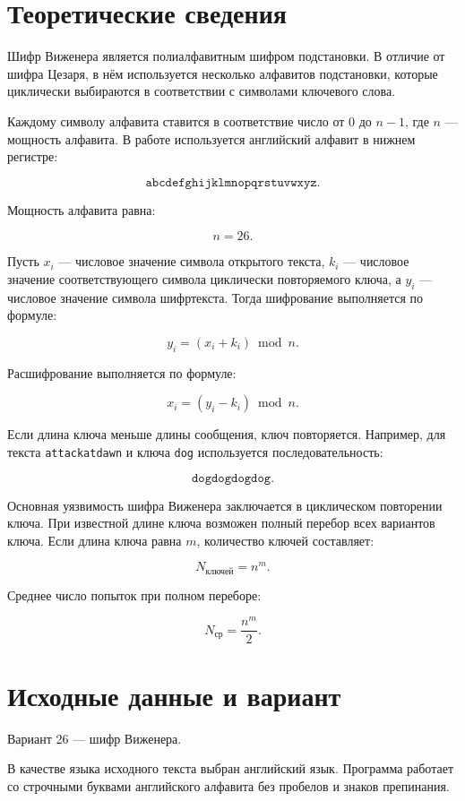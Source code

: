 \documentclass[a4paper,14pt,oneside]{extarticle}
\begin{document}
\section{Теоретические сведения}

Шифр Виженера является полиалфавитным шифром подстановки. В отличие от
шифра Цезаря, в нём используется несколько алфавитов подстановки, которые
циклически выбираются в соответствии с символами ключевого слова.

Каждому символу алфавита ставится в соответствие число от 0 до $n-1$, где
$n$ --- мощность алфавита. В работе используется английский алфавит в нижнем
регистре:

\[
\texttt{abcdefghijklmnopqrstuvwxyz}.
\]

Мощность алфавита равна:

\[
n=26.
\]

Пусть $x_i$ --- числовое значение символа открытого текста, $k_i$ ---
числовое значение соответствующего символа циклически повторяемого ключа, а
$y_i$ --- числовое значение символа шифртекста. Тогда шифрование выполняется
по формуле:

\[
y_i=(x_i+k_i)\bmod n.
\]

Расшифрование выполняется по формуле:

\[
x_i=(y_i-k_i)\bmod n.
\]

Если длина ключа меньше длины сообщения, ключ повторяется. Например, для
текста \texttt{attackatdawn} и ключа \texttt{dog} используется
последовательность:

\[
\texttt{dogdogdogdog}.
\]

Основная уязвимость шифра Виженера заключается в циклическом повторении
ключа. При известной длине ключа возможен полный перебор всех вариантов
ключа. Если длина ключа равна $m$, количество ключей составляет:

\[
N_{\text{ключей}}=n^m.
\]

Среднее число попыток при полном переборе:

\[
N_{\text{ср}}=\frac{n^m}{2}.
\]

\section{Исходные данные и вариант}

Вариант 26 --- шифр Виженера.

В качестве языка исходного текста выбран английский язык. Программа работает
со строчными буквами английского алфавита без пробелов и знаков препинания.
\end{document}
